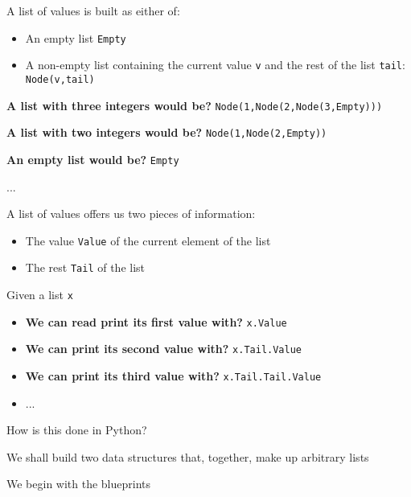 \documentclass{beamer}
\begin{document}
\begin{slide}{
\item A list of values is built as either of:
\begin{itemize}
\item An empty list \texttt{Empty}
\item A non-empty list containing the current value \texttt{v} and the rest of the list \texttt{tail}:  \texttt{Node(v,tail)}
\end{itemize}
\item \textbf{A list with three integers would be?} \pause \texttt{Node(1,Node(2,Node(3,Empty)))}
\item \textbf{A list with two integers would be?} \pause \texttt{Node(1,Node(2,Empty))}
\item \textbf{An empty list would be?} \pause \texttt{Empty}
\item ...
}\end{slide}




\begin{slide}{
\item A list of values offers us two pieces of information:
\begin{itemize}
\item The value \texttt{Value} of the current element of the list
\item The rest \texttt{Tail} of the list
\end{itemize}
\item Given a list \texttt{x}
\begin{itemize}
\item \textbf{We can read print its first value with?} \pause \texttt{x.Value}
\item \textbf{We can print its second value with?} \pause \texttt{x.Tail.Value}
\item \textbf{We can print its third value with?} \pause \texttt{x.Tail.Tail.Value}
\item ...
\end{itemize}
}\end{slide}

\begin{slide}{
\item How is this done in Python?
\item We shall build two data structures that, together, make up arbitrary lists
\item We begin with the blueprints
}\end{slide}
\end{document}
